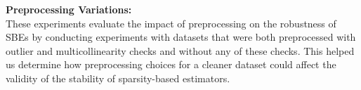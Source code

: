 \textbf{Preprocessing Variations:}\\
These experiments evaluate the impact of preprocessing on the robustness of SBEs by conducting experiments with datasets that were both preprocessed with outlier and multicollinearity checks and without any of these checks. This helped us determine how preprocessing choices for a cleaner dataset could affect the validity of the stability of sparsity-based estimators. 
